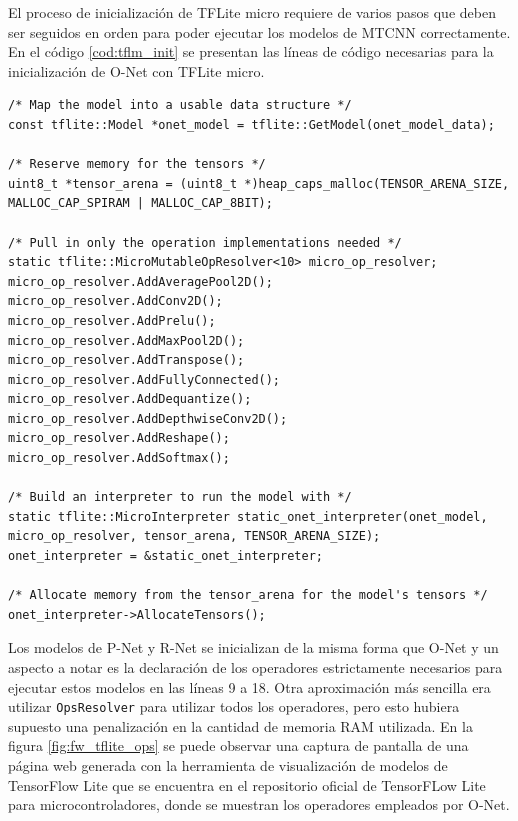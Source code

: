El proceso de inicialización de TFLite micro requiere de varios pasos que deben ser seguidos en orden para poder ejecutar los modelos de MTCNN correctamente. En el código \ref{cod:tflm_init} se presentan las líneas de código necesarias para la inicialización de O-Net con TFLite micro.

\begin{lstlisting}[label=cod:tflm_init,caption=Código para inicializar O-Net con TFLite micro.]
/* Map the model into a usable data structure */
const tflite::Model *onet_model = tflite::GetModel(onet_model_data);

/* Reserve memory for the tensors */
uint8_t *tensor_arena = (uint8_t *)heap_caps_malloc(TENSOR_ARENA_SIZE, MALLOC_CAP_SPIRAM | MALLOC_CAP_8BIT);

/* Pull in only the operation implementations needed */
static tflite::MicroMutableOpResolver<10> micro_op_resolver;
micro_op_resolver.AddAveragePool2D();
micro_op_resolver.AddConv2D();
micro_op_resolver.AddPrelu();
micro_op_resolver.AddMaxPool2D();
micro_op_resolver.AddTranspose();
micro_op_resolver.AddFullyConnected();
micro_op_resolver.AddDequantize();
micro_op_resolver.AddDepthwiseConv2D();
micro_op_resolver.AddReshape();
micro_op_resolver.AddSoftmax();

/* Build an interpreter to run the model with */
static tflite::MicroInterpreter static_onet_interpreter(onet_model, micro_op_resolver, tensor_arena, TENSOR_ARENA_SIZE);
onet_interpreter = &static_onet_interpreter;

/* Allocate memory from the tensor_arena for the model's tensors */
onet_interpreter->AllocateTensors();
\end{lstlisting}

Los modelos de P-Net y R-Net se inicializan de la misma forma que O-Net y un aspecto a notar es la declaración de los operadores estrictamente necesarios para ejecutar estos modelos en las líneas 9 a 18. Otra aproximación más sencilla era utilizar \texttt{OpsResolver} para utilizar todos los operadores, pero esto hubiera supuesto una penalización en la cantidad de memoria RAM utilizada. En la figura \ref{fig:fw_tflite_ops} se puede observar una captura de pantalla de una página web generada con la herramienta de visualización de modelos de TensorFlow Lite que se encuentra en el repositorio oficial de TensorFLow Lite para microcontroladores\cite{tflm_repo}, donde se muestran los operadores empleados por O-Net.

